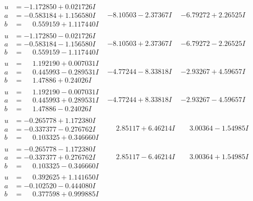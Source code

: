 \documentclass[1p]{elsarticle_modified}
\theoremstyle{definition}
\begin{document}
$$\begin{array}{c|c|c}
\begin{aligned}
u &= -1.172850 + 0.021726 I \\
a &= -0.583184 + 1.156580 I \\
b &= \phantom{-}0.559159 + 1.117440 I\end{aligned}
 & -8.10503 - 2.37367 I & -6.79272 + 2.26525 I \\ \hline\begin{aligned}
u &= -1.172850 - 0.021726 I \\
a &= -0.583184 - 1.156580 I \\
b &= \phantom{-}0.559159 - 1.117440 I\end{aligned}
 & -8.10503 + 2.37367 I & -6.79272 - 2.26525 I \\ \hline\begin{aligned}
u &= \phantom{-}1.192190 + 0.007031 I \\
a &= \phantom{-}0.445993 - 0.289531 I \\
b &= \phantom{-}1.47886 + 0.24026 I\end{aligned}
 & -4.77244 - 8.33818 I & -2.93267 + 4.59657 I \\ \hline\begin{aligned}
u &= \phantom{-}1.192190 - 0.007031 I \\
a &= \phantom{-}0.445993 + 0.289531 I \\
b &= \phantom{-}1.47886 - 0.24026 I\end{aligned}
 & -4.77244 + 8.33818 I & -2.93267 - 4.59657 I \\ \hline\begin{aligned}
u &= -0.265778 + 1.172380 I \\
a &= -0.337377 - 0.276762 I \\
b &= \phantom{-}0.103325 + 0.346660 I\end{aligned}
 & \phantom{-}2.85117 + 6.46214 I & \phantom{-}3.00364 - 1.54985 I \\ \hline\begin{aligned}
u &= -0.265778 - 1.172380 I \\
a &= -0.337377 + 0.276762 I \\
b &= \phantom{-}0.103325 - 0.346660 I\end{aligned}
 & \phantom{-}2.85117 - 6.46214 I & \phantom{-}3.00364 + 1.54985 I \\ \hline\begin{aligned}
u &= \phantom{-}0.392625 + 1.141650 I \\
a &= -0.102520 - 0.444080 I \\
b &= \phantom{-}0.377598 + 0.999885 I\end{aligned}

\end{array}$$
\end{document}
